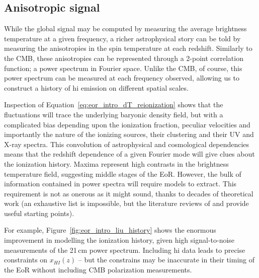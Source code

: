\subsection{Anisotropic signal}

While the global signal may be computed by measuring the average brightness temperature at a given frequency, a richer astrophysical story can be told by measuring the anisotropies in the spin temperature at each redshift. Similarly to the CMB, these anisotropies can be represented through a 2-point correlation function; a power spectrum in Fourier space. Unlike the CMB, of course, this power spectrum  can be measured at each frequency observed, allowing us to construct a history of {\sc hi} emission on different spatial scales. 

Inspection of Equation~\ref{eq:eor_intro_dT_reionization} shows that the fluctuations will trace the underlying baryonic density field, but with a complicated bias depending upon the ionization fraction, peculiar velocities and importantly the nature of the ionizing sources, their clustering and their UV and X-ray spectra. This convolution of astrophysical and cosmological dependencies means that the redshift dependence of a given Fourier mode will give clues about the ionization history. Maxima represent high contrasts in the brightness temperature field, suggesting middle stages of the EoR. However, the bulk of information contained in power spectra will require models to extract. This requirement is not as onerous as it might sound, thanks to decades of theoretical work (an exhaustive list is impossible, but the literature reviews of \citealt{Grieg.17} and \citealt{Kern.17} provide useful starting points). 

For example, Figure~\ref{fig:eor_intro_liu_history} shows the enormous improvement in modelling the ionization history, given high signal-to-noise measurements of the 21\,cm power spectrum. Including {\sc hi} data leads to precise constraints on $x_{HI}(z)$ -- but the constrains may be inaccurate in their timing of the EoR without including CMB polarization measurements. 

